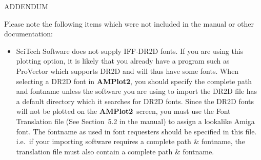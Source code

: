 \pagestyle{empty}
\newcommand{\amplot}{\mbox{\bf AMPlot2}}
\newcommand{\mog}{\mbox{\bf MoG}}
\newcommand{\cpk}{\mbox{\bf CPK}}


\fromaddress
\vspace{2em}

\begin{center}
\LARGE ADDENDUM
\end{center}
\vspace{2em}

Please note the following items which were not included in the manual or other 
documentation:

\begin{itemize}
\item {\sf SciTech Software} does not supply IFF-DR2D fonts. If you are using this 
plotting option, it is likely that you already have a program such as ProVector 
which supports DR2D and will thus have some fonts. When selecting a DR2D font in 
\amplot, you should specify the complete path and fontname unless the software you 
are using to import the DR2D file has a default directory which it searches for 
DR2D fonts. Since the DR2D fonts will not be plotted on the \amplot\ screen, you 
must use the Font Translation file (See Section~5.2 in the manual) to assign a 
lookalike Amiga font. The fontname as used in font requesters should be specified 
in this file.
i.e.\ if your importing software requires a complete path \& fontname, the 
translation file must also contain a complete path \& fontname.
\end{itemize}


